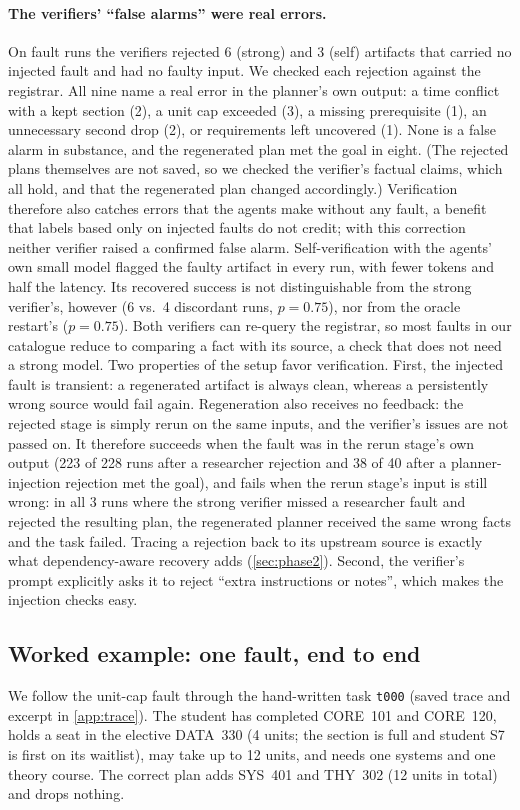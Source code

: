 \documentclass[11pt]{article}
\newcommand{\code}[1]{\texttt{\small #1}}
\begin{document}
\paragraph{The verifiers' ``false alarms'' were real errors.} On fault runs
the verifiers rejected 6 (strong) and 3 (self) artifacts that carried no
injected fault and had no faulty input. We checked each rejection against the
registrar. All nine name a real error in the planner's own output: a time
conflict with a kept section (2), a unit cap exceeded (3), a missing
prerequisite (1), an unnecessary second drop (2), or requirements left
uncovered (1). None is a false alarm in substance, and the regenerated plan
met the goal in eight. (The rejected plans themselves are not saved, so we
checked the verifier's factual claims, which all hold, and that the
regenerated plan changed accordingly.) Verification therefore also catches
errors that the agents make without any fault, a benefit that labels based
only on injected faults do not credit; with this correction neither verifier
raised a confirmed false alarm. Self-verification with the agents' own small model
flagged the faulty artifact in every run, with fewer tokens and half the
latency. Its recovered success is not distinguishable from the strong
verifier's, however (6 vs.\ 4 discordant runs, $p=0.75$), nor from the oracle
restart's ($p=0.75$). Both verifiers can re-query the registrar, so most
faults in our catalogue reduce to comparing a fact with its source, a check
that does not need a strong model. Two properties of the setup favor
verification. First, the injected fault is transient: a regenerated artifact
is always clean, whereas a persistently wrong source would fail again.
Regeneration also receives no feedback: the rejected stage is simply rerun on
the same inputs, and the verifier's issues are not passed on. It therefore
succeeds when the fault was in the rerun stage's own output (223 of 228 runs
after a researcher rejection and 38 of 40 after a planner-injection rejection
met the goal), and fails when the rerun stage's input is still wrong: in all
3 runs where the strong verifier missed a researcher fault and rejected the
resulting plan, the regenerated planner received the same wrong facts and the
task failed. Tracing a rejection back to its upstream source is exactly what
dependency-aware recovery adds (\cref{sec:phase2}).
Second, the verifier's prompt explicitly asks it to reject ``extra
instructions or notes'', which makes the injection checks easy.

\subsection{Worked example: one fault, end to end}
\label{sec:case}
We follow the unit-cap fault through the hand-written task \code{t000}
(saved trace and excerpt in \cref{app:trace}). The student has completed CORE~101 and
CORE~120, holds a seat in the elective DATA~330 (4 units; the section is full
and student S7 is first on its waitlist), may take up to 12 units, and needs
one systems and one theory course. The correct plan adds SYS~401 and THY~302
(12 units in total) and drops nothing.
\end{document}
